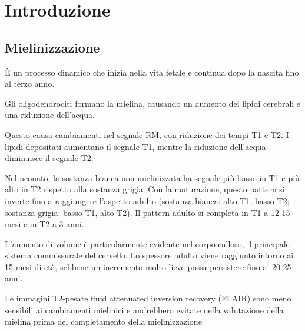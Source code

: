 \chapter{Introduzione}
\section{Mielinizzazione}
È un processo dinamico che inizia nella vita fetale e continua dopo la nascita fino al terzo anno.

Gli oligodendrociti formano la mielina, causando un aumento dei lipidi cerebrali e una riduzione dell'acqua.

Questo causa cambiamenti nel segnale RM, con riduzione dei tempi T1 e T2. I lipidi depositati aumentano il segnale T1, mentre la riduzione dell'acqua diminuisce il segnale T2.

Nel neonato, la sostanza bianca non mielinizzata ha segnale più basso in T1 e più alto in T2 rispetto alla sostanza grigia. Con la maturazione, questo pattern si inverte fino a raggiungere l'aspetto adulto (sostanza bianca: alto T1, basso T2; sostanza grigia: basso T1, alto T2). Il pattern adulto si completa in T1 a 12-15 mesi e in T2 a 3 anni.

L'aumento di volume è particolarmente evidente nel corpo calloso, il principale sistema commissurale del cervello. Lo spessore adulto viene raggiunto intorno ai 15 mesi di età, sebbene un incremento molto lieve possa persistere fino ai 20-25 anni.

Le immagini T2-pesate fluid attenuated inversion recovery (FLAIR) sono meno sensibili ai cambiamenti mielinici e andrebbero evitate nella valutazione della mielina prima del completamento della mielinizzazione

